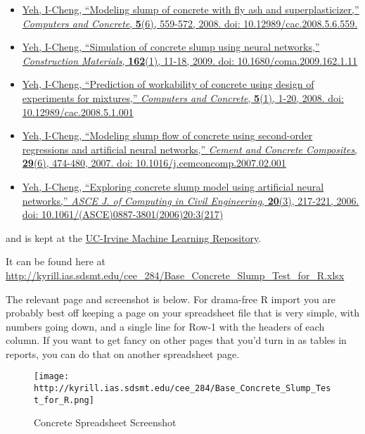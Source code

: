 \documentclass[]{article}
\begin{document}
\begin{itemize}
\item
  \href{http://www.techno-press.org/content/?page=article\&journal=cac\&volume=5\&num=6\&ordernum=4}{Yeh,
  I-Cheng, ``Modeling slump of concrete with fly ash and
  superplasticizer,'' \emph{Computers and Concrete}, \textbf{5}(6),
  559-572, 2008. doi: 10.12989/cac.2008.5.6.559.}
\item
  \href{https://www.icevirtuallibrary.com/doi/10.1680/coma.2009.162.1.11}{Yeh,
  I-Cheng, ``Simulation of concrete slump using neural networks,''
  \emph{Construction Materials}, \textbf{162}(1), 11-18, 2009. doi:
  10.1680/coma.2009.162.1.11}
\item
  \href{http://www.techno-press.org/content/?page=article\&journal=cac\&volume=5\&num=1\&ordernum=1}{Yeh,
  I-Cheng, ``Prediction of workability of concrete using design of
  experiments for mixtures,'' \emph{Computers and Concrete},
  \textbf{5}(1), 1-20, 2008. doi: 10.12989/cac.2008.5.1.001}
\item
  \href{https://www.sciencedirect.com/science/article/pii/S0958946507000261?via\%3Dihub}{Yeh,
  I-Cheng, ``Modeling slump flow of concrete using second-order
  regressions and artificial neural networks,'' \emph{Cement and
  Concrete Composites}, \textbf{29}(6), 474-480, 2007. doi:
  10.1016/j.cemconcomp.2007.02.001}
\item
  \href{https://ascelibrary.org/doi/10.1061/\%28ASCE\%290887-3801\%282006\%2920\%3A3\%28217\%29}{Yeh,
  I-Cheng, ``Exploring concrete slump model using artificial neural
  networks,'' \emph{ASCE J. of Computing in Civil Engineering},
  \textbf{20}(3), 217-221, 2006. doi:
  10.1061/(ASCE)0887-3801(2006)20:3(217)}
\end{itemize}

and is kept at the
\href{https://archive.ics.uci.edu/ml/datasets/Concrete+Slump+Test}{UC-Irvine
Machine Learning Repository}.

It can be found here at
\url{http://kyrill.ias.sdsmt.edu/cee_284/Base_Concrete_Slump_Test_for_R.xlsx}

The relevant page and screenshot is below. For drama-free R import you
are probably best off keeping a page on your spreadsheet file that is
very simple, with numbers going down, and a single line for Row-1 with
the headers of each column. If you want to get fancy on other pages that
you'd turn in as tables in reports, you can do that on another
spreadsheet page.

\begin{figure}
\centering
\texttt{[image: http://kyrill.ias.sdsmt.edu/cee\_284/Base\_Concrete\_Slump\_Test\_for\_R.png]}
\caption{Concrete Spreadsheet Screenshot}
\end{figure}
\end{document}
